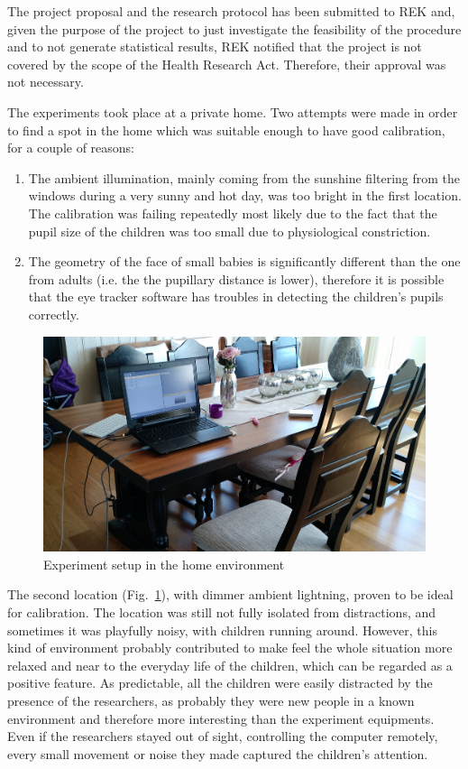 The project proposal and the research protocol has been submitted to REK and, given the purpose of the project to just investigate the feasibility of the procedure and to not generate statistical results, REK notified that the project is not covered by the scope of the Health Research Act. Therefore, their approval was not necessary.

The experiments took place at a private home. Two attempts were made in order to find a spot in the home which was suitable enough to have good calibration, for a couple of reasons:
\begin{enumerate}
    \item The ambient illumination, mainly coming from the sunshine filtering from the windows during a very sunny and hot day, was too bright in the first location. The calibration was failing repeatedly most likely due to the fact that the pupil size of the children was too small due to physiological constriction.
    \item The geometry of the face of small babies is significantly different than the one from adults (i.e. the the pupillary distance is lower), therefore it is possible that the eye tracker software has troubles in detecting the children’s pupils correctly.
\end{enumerate}

\begin{figure}[h]
  \centering
  \includegraphics[width=.8\textwidth]{figures/settingphoto.jpg}
  \caption[Experiment setup]{Experiment setup in the home environment}
  \label{fig:setupphoto}
\end{figure}

The second location (Fig.~\ref{fig:setupphoto}), with dimmer ambient lightning, proven to be ideal for calibration. The location was still not fully isolated from distractions, and sometimes it was playfully noisy, with children running around. However, this kind of environment probably contributed to make feel the whole situation more relaxed and near to the everyday life of the children, which can be regarded as a positive feature.
As predictable, all the children were easily distracted by the presence of the researchers, as probably they were new people in a known environment and therefore more interesting than the experiment equipments. Even if the researchers stayed out of sight, controlling the computer remotely, every small movement or noise they made captured the children’s attention.

